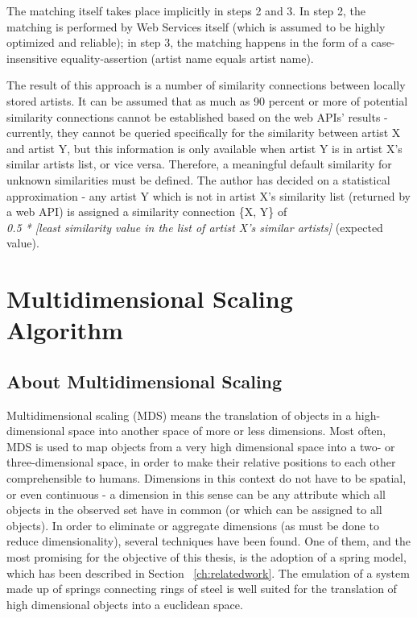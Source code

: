 The matching itself takes place implicitly in steps 2 and 3. In step 2, the matching is performed by Web Services
itself (which is assumed to be highly optimized and reliable); in step 3, the matching happens in the form of a
case-insensitive equality-assertion (artist name equals artist name). 

The result of this approach is a number of similarity connections between locally stored artists. It can be assumed
that as much as 90 percent or more of potential similarity connections cannot be established based on the web APIs'
results - currently, they cannot be queried specifically for the similarity between artist X and artist Y, but 
this information is only available when artist Y is in artist X's similar artists list, or vice versa.
Therefore, a meaningful default similarity for unknown similarities must be defined. The author has decided on a
statistical approximation - any artist Y which is not in artist X's similarity list (returned by a web API) is 
assigned a similarity connection \{X, Y\} of \\
\emph{0.5 * [least similarity value in the list of artist X's similar artists]} (expected value).

\section{Multidimensional Scaling Algorithm}
\label{sec:mds-algorithm}

\subsection{About Multidimensional Scaling}

Multidimensional scaling (MDS) means the translation of objects in a high-dimensional space into another space of more or less dimensions. Most often, MDS is used to map objects from a very high dimensional space into a two- or three-dimensional space, in order to make their relative positions to each other comprehensible to humans. 
Dimensions in this context do not have to be spatial, or even continuous - a dimension in this sense can be any attribute which all objects in the observed set have in common (or which can be assigned to all objects).
In order to eliminate or aggregate dimensions (as must be done to reduce dimensionality), several techniques have been found.
One of them, and the most promising for the objective of this thesis, is the adoption of a spring model, which has been described in Section ~\ref{ch:relatedwork}. The emulation of a system made up of springs connecting rings of steel is well suited for the translation of high dimensional objects into a euclidean space.

